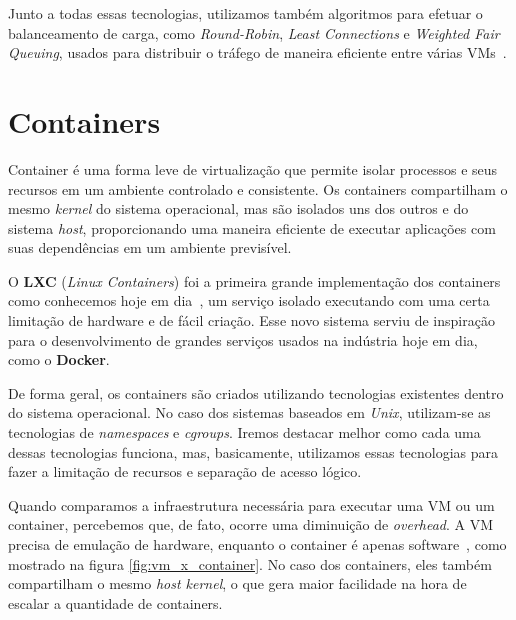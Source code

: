 Junto a todas essas tecnologias, utilizamos também algoritmos para efetuar o balanceamento de carga, como \textit{Round-Robin}, \textit{Least Connections} e \textit{Weighted Fair Queuing}, usados para distribuir o tráfego de maneira eficiente entre várias VMs~\citep{dong2012high}.


\section{Containers}

Container é uma forma leve de virtualização que permite isolar processos e seus recursos em um ambiente controlado e consistente. Os containers compartilham o mesmo \textit{kernel} do sistema operacional, mas são isolados uns dos outros e do sistema \textit{host}, proporcionando uma maneira eficiente de executar aplicações com suas dependências em um ambiente previsível.

O \textbf{LXC} (\textit{Linux Containers}) foi a primeira grande implementação dos containers como conhecemos hoje em dia~\citep{HistoryOfCloudByIBM}, um serviço isolado executando com uma certa limitação de hardware e de fácil criação. Esse novo sistema serviu de inspiração para o desenvolvimento de grandes serviços usados na indústria hoje em dia, como o \textbf{Docker}.

De forma geral, os containers são criados utilizando tecnologias existentes dentro do sistema operacional. No caso dos sistemas baseados em \textit{Unix}, utilizam-se as tecnologias de \textit{namespaces} e \textit{cgroups}. Iremos destacar melhor como cada uma dessas tecnologias funciona, mas, basicamente, utilizamos essas tecnologias para fazer a limitação de recursos e separação de acesso lógico.

Quando comparamos a infraestrutura necessária para executar uma VM ou um container, percebemos que, de fato, ocorre uma diminuição de \textit{overhead}. A VM precisa de emulação de hardware, enquanto o container é apenas software~\citep{OCIContainer}, como mostrado na figura \ref{fig:vm_x_container}. No caso dos containers, eles também compartilham o mesmo \textit{host kernel}, o que gera maior facilidade na hora de escalar a quantidade de containers.


